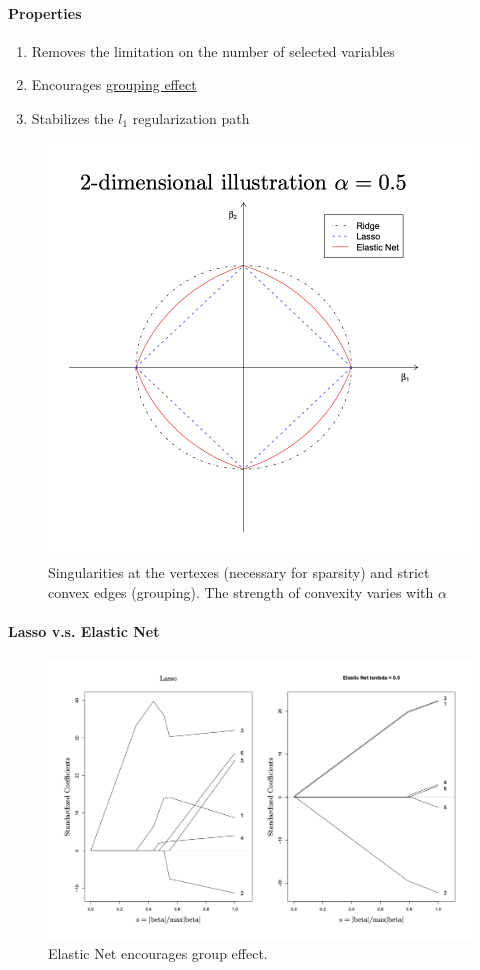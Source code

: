 \documentclass[11pt]{article}
\newcommand{\under}[1]{\underline{#1}}
\begin{document}
 \paragraph{Properties}
 \begin{enumerate}
 	\item Removes the limitation on the number of selected variables
 	\item Encourages \under{grouping effect}
 	\item Stabilizes the $l_1$ regularization path
 \end{enumerate}
 \begin{figure}[h]
	\centering
	\includegraphics[scale=0.6]{elastic.png}
	\caption{Singularities at the vertexes (necessary for sparsity) and strict convex edges (grouping). The strength of convexity varies with $\alpha$}
\end{figure}
\paragraph{Lasso v.s. Elastic Net}

 \begin{figure}[h]
	\centering
	\includegraphics[scale=0.6]{vs2.png}
	\caption{Elastic Net encourages group effect.}
\end{figure}
 
 
 
 
\end{document}
